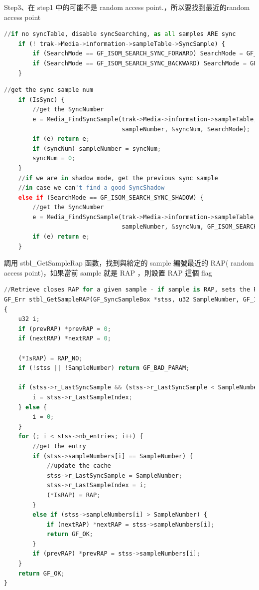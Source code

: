 \documentclass[10pt,UTF8]{ctexart}
\begin{document}
Step3、在 step1 中的可能不是 random access point.，所以要找到最近的random access point

\begin{lstlisting}[language={python}]
	//if no syncTable, disable syncSearching, as all samples ARE sync
	if (! trak->Media->information->sampleTable->SyncSample) {
		if (SearchMode == GF_ISOM_SEARCH_SYNC_FORWARD) SearchMode = GF_ISOM_SEARCH_FORWARD;
		if (SearchMode == GF_ISOM_SEARCH_SYNC_BACKWARD) SearchMode = GF_ISOM_SEARCH_BACKWARD;
	}
\end{lstlisting}

\begin{lstlisting}[language={python}]
	//get the sync sample num
	if (IsSync) {
		//get the SyncNumber
		e = Media_FindSyncSample(trak->Media->information->sampleTable,
		                         sampleNumber, &syncNum, SearchMode);
		if (e) return e;
		if (syncNum) sampleNumber = syncNum;
		syncNum = 0;
	}
	//if we are in shadow mode, get the previous sync sample
	//in case we can't find a good SyncShadow
	else if (SearchMode == GF_ISOM_SEARCH_SYNC_SHADOW) {
		//get the SyncNumber
		e = Media_FindSyncSample(trak->Media->information->sampleTable,
		                         sampleNumber, &syncNum, GF_ISOM_SEARCH_SYNC_BACKWARD);
		if (e) return e;
	}
\end{lstlisting}

調⽤ stbl\_GetSampleRap 函數，找到與給定的 sample 編號最近的 RAP( random access point)，如果當前 sample 就是 RAP ，則設置 RAP 這個 flag

\begin{lstlisting}[language={python}]
//Retrieve closes RAP for a given sample - if sample is RAP, sets the RAP flag
GF_Err stbl_GetSampleRAP(GF_SyncSampleBox *stss, u32 SampleNumber, GF_ISOSAPType *IsRAP, u32 *prevRAP, u32 *nextRAP)
{
	u32 i;
	if (prevRAP) *prevRAP = 0;
	if (nextRAP) *nextRAP = 0;

	(*IsRAP) = RAP_NO;
	if (!stss || !SampleNumber) return GF_BAD_PARAM;

	if (stss->r_LastSyncSample && (stss->r_LastSyncSample < SampleNumber) ) {
		i = stss->r_LastSampleIndex;
	} else {
		i = 0;
	}
	for (; i < stss->nb_entries; i++) {
		//get the entry
		if (stss->sampleNumbers[i] == SampleNumber) {
			//update the cache
			stss->r_LastSyncSample = SampleNumber;
			stss->r_LastSampleIndex = i;
			(*IsRAP) = RAP;
		}
		else if (stss->sampleNumbers[i] > SampleNumber) {
			if (nextRAP) *nextRAP = stss->sampleNumbers[i];
			return GF_OK;
		}
		if (prevRAP) *prevRAP = stss->sampleNumbers[i];
	}
	return GF_OK;
}
\end{lstlisting}
\end{document}
